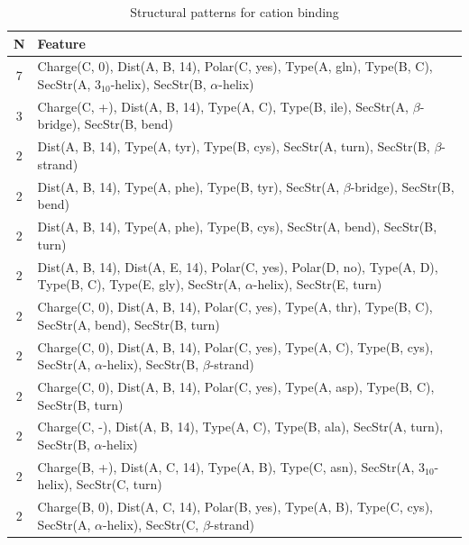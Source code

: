 \documentclass[11pt,twoside,a4paper]{book}
\begin{document}
\begin{table}\begin{tabularx}{\textwidth}{cX}\textbf{N} & \textbf{Feature} \\ \hline  
7 & Charge(C, 0), Dist(A, B, 14), Polar(C, yes),  Type(A, gln), Type(B, C), \newline  SecStr(A, $3_{10}$-helix), SecStr(B, $\alpha$-helix)\\ \hline 
3 & Charge(C, +), Dist(A, B, 14),  Type(A, C), Type(B, ile), SecStr(A, $\beta$-bridge), \newline SecStr(B, bend)\\ \hline 
2 & Dist(A, B, 14),  Type(A, tyr), Type(B, cys), SecStr(A, turn), SecStr(B, $\beta$-strand)\\ \hline 
2 & Dist(A, B, 14),  Type(A, phe), Type(B, tyr), SecStr(A, $\beta$-bridge), SecStr(B, bend)\\ \hline 
2 & Dist(A, B, 14),  Type(A, phe), Type(B, cys), SecStr(A, bend), SecStr(B, turn)\\ \hline 
2 & Dist(A, B, 14), Dist(A, E, 14), Polar(C, yes), Polar(D, no),  Type(A, D), Type(B, C), Type(E, gly), SecStr(A, $\alpha$-helix), SecStr(E, turn)\\ \hline 
2 & Charge(C, 0), Dist(A, B, 14), Polar(C, yes),  Type(A, thr), Type(B, C), \newline SecStr(A, bend), SecStr(B, turn)\\ \hline 
2 & Charge(C, 0), Dist(A, B, 14), Polar(C, yes),  Type(A, C), Type(B, cys), \newline SecStr(A, $\alpha$-helix), SecStr(B, $\beta$-strand)\\ \hline 
2 & Charge(C, 0), Dist(A, B, 14), Polar(C, yes),  Type(A, asp), Type(B, C), \newline SecStr(B, turn)\\ \hline 
2 & Charge(C, -), Dist(A, B, 14),  Type(A, C), Type(B, ala), SecStr(A, turn), \newline SecStr(B, $\alpha$-helix)\\ \hline 
2 & Charge(B, +), Dist(A, C, 14),  Type(A, B), Type(C, asn), SecStr(A, $3_{10}$-helix), \newline SecStr(C, turn)\\ \hline 
2 & Charge(B, 0), Dist(A, C, 14), Polar(B, yes),  Type(A, B), Type(C, cys), \newline SecStr(A, $\alpha$-helix), SecStr(C, $\beta$-strand)\\ \hline 
 \end{tabularx}\caption{Structural patterns for cation binding}\label{tab:cation_binding}\end{table}
\end{document}

